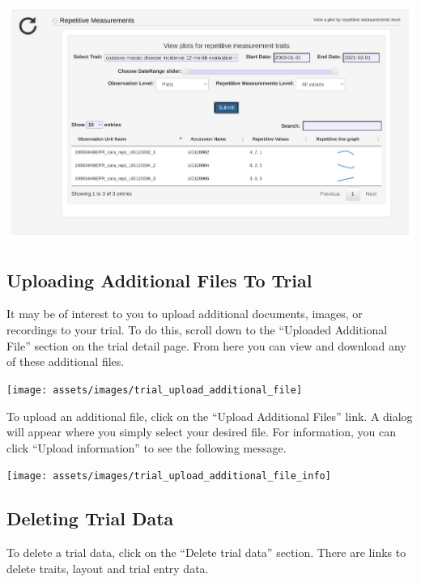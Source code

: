 \documentclass[
  12pt,
]{book}
\begin{document}
\begin{center}\includegraphics[width=0.95\linewidth]{assets/images/trial_detail_page_view_repetitive_measurements} \end{center}

\hypertarget{uploading-additional-files-to-trial}{%
\subsection{Uploading Additional Files To Trial}\label{uploading-additional-files-to-trial}}

It may be of interest to you to upload additional documents, images, or recordings to your trial. To do this, scroll down to the ``Uploaded Additional File'' section on the trial detail page. From here you can view and download any of these additional files.

\begin{center}\texttt{[image: assets/images/trial\_upload\_additional\_file]} \end{center}

To upload an additional file, click on the ``Upload Additional Files'' link. A dialog will appear where you simply select your desired file. For information, you can click ``Upload information'' to see the following message.

\begin{center}\texttt{[image: assets/images/trial\_upload\_additional\_file\_info]} \end{center}

\hypertarget{deleting-trial-data}{%
\subsection{Deleting Trial Data}\label{deleting-trial-data}}

To delete a trial data, click on the ``Delete trial data'' section. There are links to delete traits, layout and trial entry data.
\end{document}
